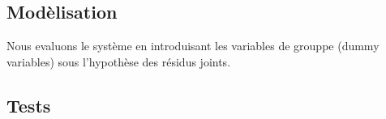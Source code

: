 \documentclass[11pt,]{article}
\begin{document}
\FloatBarrier

\hypertarget{modelisation-2}{%
\subsection{Modèlisation}\label{modelisation-2}}

\FloatBarrier

Nous evaluons le système en introduisant les variables de grouppe (dummy
variables) sous l'hypothèse des résidus joints.

\FloatBarrier

\FloatBarrier

\hypertarget{tests-1}{%
\subsection{Tests}\label{tests-1}}

\FloatBarrier
\end{document}
